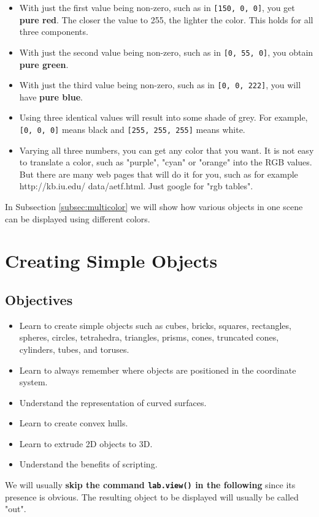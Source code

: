 \begin{itemize}
\item With just the first value being non-zero, such as in {\tt [150, 0, 0]},
      you get {\bf pure red}. The closer the value to 255, the lighter the color.
      This holds for all three components.
\item With just the second value being non-zero, such as in {\tt [0, 55, 0]},
      you obtain {\bf pure green}.
\item With just the third value being non-zero, such as in {\tt [0, 0, 222]},
      you will have {\bf pure blue}. 
\item Using three identical values will result into some shade of grey. For 
      example, {\tt [0, 0, 0]}
      means black and {\tt [255, 255, 255]} means white.
\item Varying all three numbers, you can get any color that you want. It is not 
      easy to translate a color, such as "purple", "cyan" or "orange" into the RGB
      values. But there are many web pages that will do it for you, such as for
      example http://kb.iu.edu/ data/aetf.html. Just google for "rgb tables".
\end{itemize}
In Subsection \ref{subsec:multicolor} we will show how various objects in
one scene can be displayed using different colors.

\section{Creating Simple Objects}

\subsection{Objectives}
\begin{itemize}
\item Learn to create simple objects such as cubes, bricks, squares, rectangles, spheres, circles, 
      tetrahedra, triangles, prisms, cones, truncated cones, 
      cylinders, tubes, and toruses. 
\item Learn to always remember where objects are positioned in the coordinate system.
\item Understand the representation of curved surfaces.
\item Learn to create convex hulls.
\item Learn to extrude 2D objects to 3D.
\item Understand the benefits of scripting.
\end{itemize}
We will usually {\bf skip the command
{\tt lab.view()} in the following} since its presence is obvious.
The resulting object to be displayed will usually be called "out".

